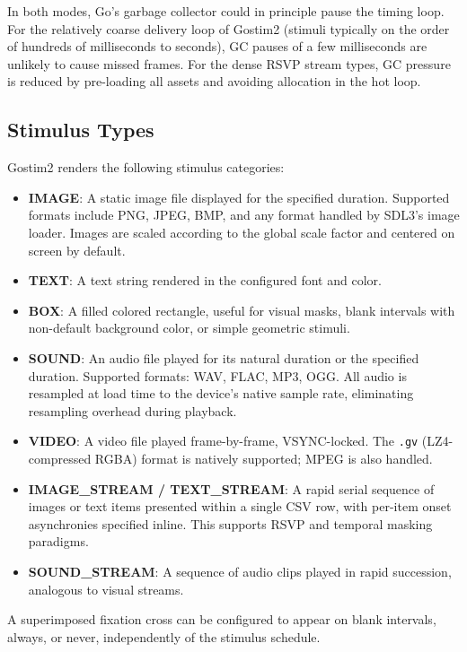 \documentclass[
  11pt,
]{article}
\providecommand{\tightlist}{%
  \setlength{\itemsep}{0pt}\setlength{\parskip}{0pt}}
\begin{document}
In both modes, Go's garbage collector could in principle pause the
timing loop. For the relatively coarse delivery loop of Gostim2 (stimuli
typically on the order of hundreds of milliseconds to seconds), GC
pauses of a few milliseconds are unlikely to cause missed frames. For
the dense RSVP stream types, GC pressure is reduced by pre-loading all
assets and avoiding allocation in the hot loop.

\subsection{Stimulus Types}\label{stimulus-types}

Gostim2 renders the following stimulus categories:

\begin{itemize}
\tightlist
\item
  \textbf{IMAGE}: A static image file displayed for the specified
  duration. Supported formats include PNG, JPEG, BMP, and any format
  handled by SDL3's image loader. Images are scaled according to the
  global scale factor and centered on screen by default.
\item
  \textbf{TEXT}: A text string rendered in the configured font and
  color.
\item
  \textbf{BOX}: A filled colored rectangle, useful for visual masks,
  blank intervals with non-default background color, or simple geometric
  stimuli.
\item
  \textbf{SOUND}: An audio file played for its natural duration or the
  specified duration. Supported formats: WAV, FLAC, MP3, OGG. All audio
  is resampled at load time to the device's native sample rate,
  eliminating resampling overhead during playback.
\item
  \textbf{VIDEO}: A video file played frame-by-frame, VSYNC-locked. The
  \texttt{.gv} (LZ4-compressed RGBA) format is natively supported; MPEG
  is also handled.
\item
  \textbf{IMAGE\_STREAM / TEXT\_STREAM}: A rapid serial sequence of
  images or text items presented within a single CSV row, with per-item
  onset asynchronies specified inline. This supports RSVP and temporal
  masking paradigms.
\item
  \textbf{SOUND\_STREAM}: A sequence of audio clips played in rapid
  succession, analogous to visual streams.
\end{itemize}

A superimposed fixation cross can be configured to appear on blank
intervals, always, or never, independently of the stimulus schedule.
\end{document}
